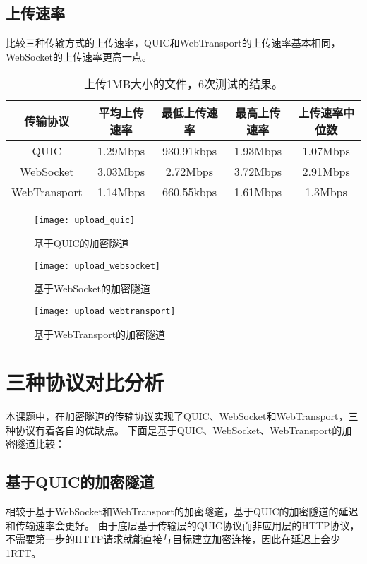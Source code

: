 \subsection{上传速率}
比较三种传输方式的上传速率，QUIC和WebTransport的上传速率基本相同，WebSocket的上传速率更高一点。

\begin{table}[H]
  \begin{tabular}{|c|c|c|c|c|}
  \hline
  传输协议 & 平均上传速率 & 最低上传速率 & 最高上传速率 & 上传速率中位数  \\ \hline        
  QUIC & 1.29Mbps & 930.91kbps & 1.93Mbps & 1.07Mbps \\ \hline    
  WebSocket & 3.03Mbps & 2.72Mbps & 3.72Mbps & 2.91Mbps \\ \hline          
  WebTransport & 1.14Mbps & 660.55kbps & 1.61Mbps & 1.3Mbps \\ \hline         
  \end{tabular}
  \caption{上传1MB大小的文件，6次测试的结果。}
\end{table}

\begin{figure}[H]
  \centering
  \texttt{[image: upload\_quic]}
  \caption{基于QUIC的加密隧道}
\end{figure}

\begin{figure}[H]
  \centering
  \texttt{[image: upload\_websocket]}
  \caption{基于WebSocket的加密隧道}
\end{figure}

\begin{figure}[H]
  \centering
  \texttt{[image: upload\_webtransport]}
  \caption{基于WebTransport的加密隧道}
\end{figure}

\section{三种协议对比分析}
本课题中，在加密隧道的传输协议实现了QUIC、WebSocket和WebTransport，三种协议有着各自的优缺点。
下面是基于QUIC、WebSocket、WebTransport的加密隧道比较：

\subsection{基于QUIC的加密隧道}
相较于基于WebSocket和WebTransport的加密隧道，基于QUIC的加密隧道的延迟和传输速率会更好。
由于底层基于传输层的QUIC协议而非应用层的HTTP协议，不需要第一步的HTTP请求就能直接与目标建立加密连接，因此在延迟上会少1RTT。

